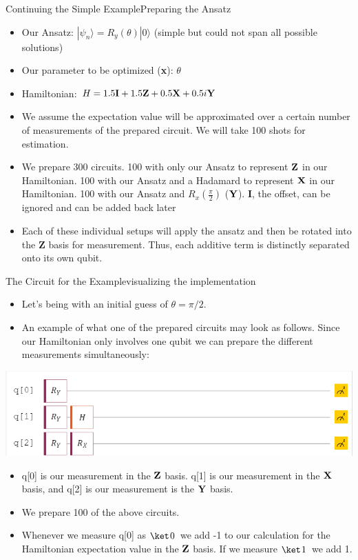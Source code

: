 \begin{frame}{Continuing the Simple Example}{Preparing the Ansatz}
\begin{itemize}
    \item Our Ansatz: $ | \psi_n \rangle = R_y(\theta) | 0 \rangle$ (simple but could not span all possible solutions)
    \item Our parameter to be optimized (\textbf{x}): $\theta$
    \item  Hamiltonian: $H = 1.5\mbox{\bfseries{\textrm{I}}} + 1.5\mbox{\bfseries{\textrm{Z}}} + 0.5 \mbox{\bfseries{\textrm{X}}} + 0.5i\mbox{\bfseries{\textrm{Y}}}$
    \item We assume the expectation value will be approximated over a certain number of measurements of the prepared circuit. We will take 100 shots for estimation. 
    \item We prepare 300 circuits. 100 with only our Ansatz to represent $\mbox{\bfseries{\textrm{Z}}}$  in our Hamiltonian. 100 with our Ansatz and a Hadamard to represent $\mbox{\bfseries{\textrm{X}}}$ in our Hamiltonian. 100 with our Ansatz and $R_x (\frac{\pi}{2})$ ($\mbox{\bfseries{\textrm{Y}}}$). \textbf{I}, the offset, can be ignored and can be added back later
    \item Each of these individual setups will apply the ansatz and then be rotated into the \textbf{Z} basis for measurement. Thus, each additive term is distinctly separated onto its own qubit.
\end{itemize}

\end{frame}


\begin{frame}{The Circuit for the Example}{visualizing the implementation}
\begin{itemize}
    \item Let's being with an initial guess of $\theta = \pi/2$.
    \item An example of what one of the prepared circuits may look as follows. Since our Hamiltonian only involves one qubit we can prepare the different measurements simultaneously:
\end{itemize} 



\includegraphics[scale = 0.5]{400/VQE_ex_circuit.PNG}

\begin{itemize}
    \item q[0] is our measurement in the $\mbox{\bfseries{\textrm{Z}}}$ basis. q[1] is our measurement in the $\mbox{\bfseries{\textrm{X}}}$ basis, and q[2] is our measurement is the $\mbox{\bfseries{\textrm{Y}}}$ basis.
    \item We prepare 100 of the above circuits.
    \item  Whenever we measure q[0] as $\QZero$ we add -1 to our calculation for the Hamiltonian expectation value in the $\mbox{\bfseries{\textrm{Z}}}$ basis. If we measure $\QOne$ we add 1. 
\end{itemize}
\end{frame}

